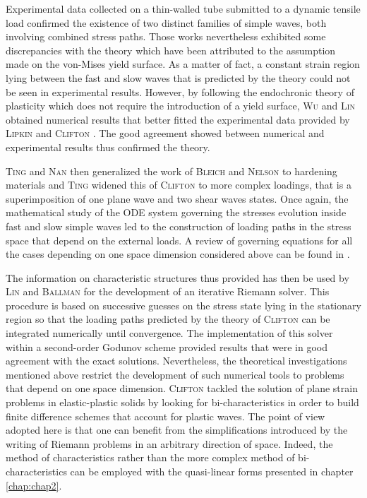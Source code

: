Experimental data collected on a thin-walled tube submitted to a dynamic tensile load \cite{Clifton_exp,Clifton_exp2} confirmed the existence of two distinct families of  simple waves, both involving combined stress paths.
Those works nevertheless exhibited some discrepancies with the theory which have been attributed to the assumption made on the von-Mises yield surface.
As a matter of fact, a constant strain region lying between the fast and slow waves that is predicted by the theory \cite{Clifton} could not be seen in experimental results.
However, by following the endochronic theory of plasticity \cite{Valanis} which does not require the introduction of a yield surface, \textsc{Wu} and \textsc{Lin} \cite{Wu_experimental} obtained numerical results that better fitted the experimental data provided by \textsc{Lipkin} and \textsc{Clifton} \cite{Clifton_exp2}.
The good agreement showed between numerical and experimental results \cite{Wu_experimental} thus confirmed the theory.

\textsc{Ting} and \textsc{Nan} \cite{Ting68} then generalized the work of \textsc{Bleich} and \textsc{Nelson} to hardening materials and \textsc{Ting} \cite{Ting69} widened this of \textsc{Clifton} to more complex loadings, that is a superimposition of one plane wave and two shear waves states.
Once again, the mathematical study of the ODE system governing the stresses evolution inside fast and slow simple waves led to the construction of loading paths in the stress space that depend on the external loads. A review of governing equations for all the cases depending on one space dimension considered above can be found in \cite{Nowacki}.

The information on characteristic structures thus provided has then be used by \textsc{Lin} and \textsc{Ballman} \cite{Lin_et_Ballman} for the development of an iterative Riemann solver.
This procedure is based on successive guesses on the stress state lying in the stationary region so that the loading paths predicted by the theory of \textsc{Clifton} \cite{Clifton} can be integrated numerically until convergence.
The implementation of this solver within a second-order Godunov scheme provided results that were in good agreement with the exact solutions.
Nevertheless, the theoretical investigations mentioned above restrict the development of such numerical tools to problems that depend on one space dimension.
\textsc{Clifton} tackled the solution of plane strain problems in elastic-plastic solids by looking for bi-characteristics \cite{Clifton_thesis} in order to build finite difference schemes that account for plastic waves.
The point of view adopted here is that one can benefit from the simplifications introduced by the writing of Riemann problems in an arbitrary direction of space.
Indeed, the method of characteristics rather than the more complex method of bi-characteristics can be employed with the quasi-linear forms presented in chapter \ref{chap:chap2}.

